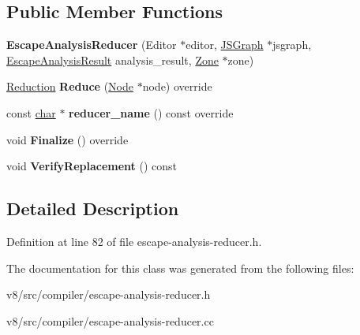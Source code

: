\subsection*{Public Member Functions}
\begin{DoxyCompactItemize}
\item 
\mbox{\label{classv8_1_1internal_1_1compiler_1_1EscapeAnalysisReducer_a5f385ab67d47b47bcd56c4e6f448abff}} 
{\bfseries Escape\+Analysis\+Reducer} (Editor $\ast$editor, \mbox{\hyperlink{classv8_1_1internal_1_1compiler_1_1JSGraph}{J\+S\+Graph}} $\ast$jsgraph, \mbox{\hyperlink{classv8_1_1internal_1_1compiler_1_1EscapeAnalysisResult}{Escape\+Analysis\+Result}} analysis\+\_\+result, \mbox{\hyperlink{classv8_1_1internal_1_1Zone}{Zone}} $\ast$zone)
\item 
\mbox{\label{classv8_1_1internal_1_1compiler_1_1EscapeAnalysisReducer_a38774438cdcf5bf0907caa0e09d3c50b}} 
\mbox{\hyperlink{classv8_1_1internal_1_1compiler_1_1Reduction}{Reduction}} {\bfseries Reduce} (\mbox{\hyperlink{classv8_1_1internal_1_1compiler_1_1Node}{Node}} $\ast$node) override
\item 
\mbox{\label{classv8_1_1internal_1_1compiler_1_1EscapeAnalysisReducer_adafa5b75c66b58bf301324626fa51f9b}} 
const \mbox{\hyperlink{classchar}{char}} $\ast$ {\bfseries reducer\+\_\+name} () const override
\item 
\mbox{\label{classv8_1_1internal_1_1compiler_1_1EscapeAnalysisReducer_a5566006e13b5381efd9458b2f79188e7}} 
void {\bfseries Finalize} () override
\item 
\mbox{\label{classv8_1_1internal_1_1compiler_1_1EscapeAnalysisReducer_a71a40fed7ae46062cb0615afa835b5cb}} 
void {\bfseries Verify\+Replacement} () const
\end{DoxyCompactItemize}


\subsection{Detailed Description}


Definition at line 82 of file escape-\/analysis-\/reducer.\+h.



The documentation for this class was generated from the following files\+:\begin{DoxyCompactItemize}
\item 
v8/src/compiler/escape-\/analysis-\/reducer.\+h\item 
v8/src/compiler/escape-\/analysis-\/reducer.\+cc\end{DoxyCompactItemize}
